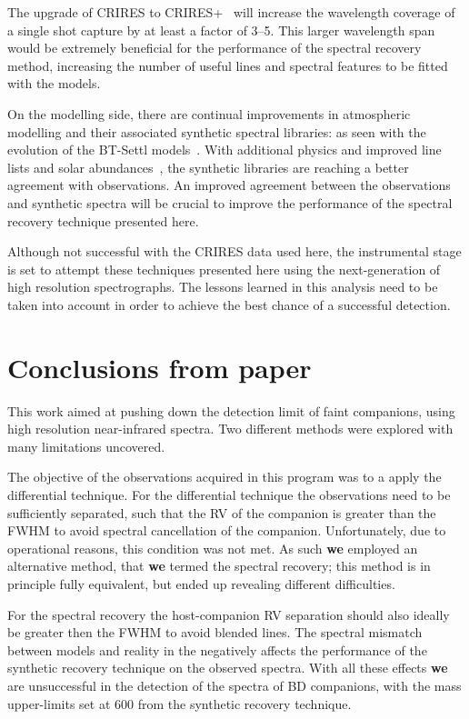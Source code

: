 The upgrade of CRIRES to CRIRES+~\citep{dorn_crires_2016} will increase the wavelength coverage of a single shot capture by at least a factor of 3--5.
This larger wavelength span would be extremely beneficial for the \textchisquared{} performance of the spectral recovery method, increasing the number of useful lines and spectral features to be fitted with the models.

On the modelling side, there are continual improvements in atmospheric modelling and their associated synthetic spectral libraries: as seen with the evolution of the {BT-Settl} models~\cite{allard_btsettl_2013}.
With additional physics and improved line lists and solar abundances~\citep [e.g.][]{asplund_chemical_2009,caffau_solar_2011}, the synthetic libraries are reaching a better agreement with \nir{} observations.
An improved agreement between the \nir{} observations and synthetic spectra will be crucial to improve the performance of the spectral recovery technique presented here.

Although not successful with the CRIRES data used here, the instrumental stage is set to attempt these techniques presented here using the next-generation of high resolution spectrographs.
The lessons learned in this analysis need to be taken into account in order to achieve the best chance of a successful detection.


\section{Conclusions from paper}
\label{sec:conclusionsfrom paper}
This work aimed at pushing down the detection limit of faint companions, using high resolution near-infrared spectra.
Two different methods were explored with many limitations uncovered.

The objective of the observations acquired in this program was to a apply the differential technique.
For the differential technique the observations need to be sufficiently separated, such that the {RV} of the companion is greater than the {FWHM} to avoid spectral cancellation of the companion.
Unfortunately, due to operational reasons, this condition was not met.
As such \textbf{we} employed an alternative method, that \textbf{we} termed the spectral recovery; this method is in principle fully equivalent, but ended up revealing different difficulties.

For the spectral recovery the host-companion {RV} separation should also ideally be greater then the {FWHM} to avoid blended lines.
The spectral mismatch between models and reality in the \nir{} negatively affects the performance of the synthetic recovery technique on the observed spectra.
With all these effects \textbf{we} are unsuccessful in the detection of the \nir{} spectra of {BD} companions,  with the mass upper-limits set at 600\Mjup{} from the synthetic recovery technique.

